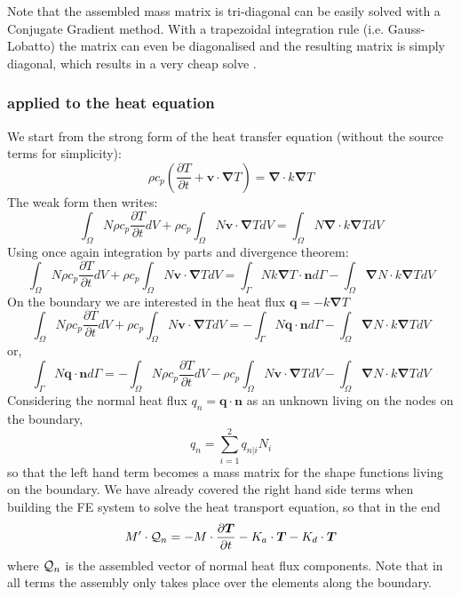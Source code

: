 Note that the assembled mass matrix is tri-diagonal can be easily solved with 
a Conjugate Gradient method. With a trapezoidal integration rule 
(i.e. Gauss-Lobatto) the matrix can even be diagonalised and the resulting 
matrix is simply diagonal, which results in a very cheap solve \cite{zhgh93}.

\subsubsection{applied to the heat equation}
We start from the strong form of the heat transfer equation (without the source terms for simplicity):
\[
\rho c_p
\left(\frac{\partial T}{\partial t} + {\bm v}\cdot {\bm \nabla}T\right)
=
{\bm \nabla} \cdot k{\bm \nabla T}
\]
The weak form then writes:
\[
\int_\Omega N
\rho c_p
\frac{\partial T}{\partial t} dV 
+
\rho c_p
\int_\Omega N
 {\bm v}\cdot {\bm \nabla}T  dV
=
\int_\Omega N
{\bm \nabla} \cdot k{\bm \nabla T} dV
\]
Using once again integration by parts and divergence theorem:
\[
\int_\Omega N
\rho c_p
\frac{\partial T}{\partial t} dV 
+
\rho c_p
\int_\Omega N
 {\bm v}\cdot {\bm \nabla}T  dV
=
\int_\Gamma N k {\bm \nabla T} \cdot {\bm n} d\Gamma
-
\int_\Omega  {\bm \nabla} N \cdot k{\bm \nabla T} dV
\]
On the boundary we are interested in the heat flux ${\bm q}=-k {\bm \nabla T}$
\[
\int_\Omega N
\rho c_p
\frac{\partial T}{\partial t} dV 
+
\rho c_p
\int_\Omega N
 {\bm v}\cdot {\bm \nabla}T  dV
=
-\int_\Gamma N {\bm q} \cdot {\bm n} d\Gamma
- \int_\Omega  {\bm \nabla} N \cdot k{\bm \nabla T} dV
\]
or,
\[
\int_\Gamma N {\bm q} \cdot {\bm n} d\Gamma
=
-\int_\Omega N
\rho c_p
\frac{\partial T}{\partial t} dV 
-\rho c_p
\int_\Omega N
 {\bm v}\cdot {\bm \nabla}T  dV
- \int_\Omega  {\bm \nabla} N \cdot k{\bm \nabla T} dV
\]
Considering the normal heat flux $q_n = {\bm q} \cdot {\bm n}$ as an unknown 
living on the nodes on the boundary, 
\[
q_n = \sum_{i=1}^2 q_{n|i} N_i
\]
so that the left hand term becomes a mass matrix for the shape functions living on 
the boundary.
We have already covered the right hand side terms when building the FE system 
to solve the heat transport equation, so that in the end 
\[
M' \cdot {\cal Q}_n =
- M \cdot \frac{\partial \bm T}{\partial t} -K_a \cdot {\bm T} - K_d \cdot {\bm T} 
\]
where ${\cal Q}_n$ is the assembled vector of normal heat flux components.
Note that in all terms the assembly only takes place over the elements along the boundary.







